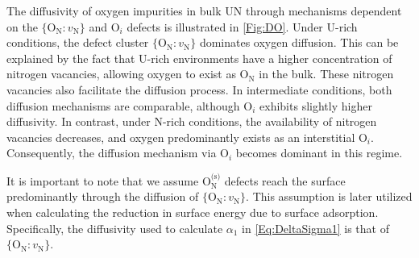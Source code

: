 \documentclass[preprint,12pt,sort&compress]{elsarticle}
\newcommand{\?}{\stackrel{?}{=}}
\providecommand{\DIFdeltex}[1]{} %
\providecommand{\DIFdelbegin}{\protect\color{red}} %
\providecommand{\DIFdelFL}[1]{\DIFdel{#1}} %
\providecommand{\DIFdel}[1]{\texorpdfstring{\DIFdeltex{#1}}{}} %
\newcommand{\DIFscaledelfig}{0.5}
\newlength{\DIFdelgraphicswidth} %
\newlength{\DIFdelgraphicsheight} %
\newcommand{\DIFdelincludegraphics}[2][]{%
\sbox{\DIFdelgraphicsbox}{\DIFOincludegraphics[#1]{#2}}%
\settoboxwidth{\DIFdelgraphicswidth}{\DIFdelgraphicsbox} %
\settoboxtotalheight{\DIFdelgraphicsheight}{\DIFdelgraphicsbox} %
\scalebox{\DIFscaledelfig}{%
\parbox[b]{\DIFdelgraphicswidth}{\usebox{\DIFdelgraphicsbox}\\[-\baselineskip] \rule{\DIFdelgraphicswidth}{0em}}\llap{\resizebox{\DIFdelgraphicswidth}{\DIFdelgraphicsheight}{%
\setlength{\unitlength}{\DIFdelgraphicswidth}%
\begin{picture}(1,1)%
\thicklines\linethickness{2pt} %
{\color[rgb]{1,0,0}\put(0,0){\framebox(1,1){}}}%
{\color[rgb]{1,0,0}\put(0,0){\line( 1,1){1}}}%
{\color[rgb]{1,0,0}\put(0,1){\line(1,-1){1}}}%
\end{picture}%
}\hspace*{3pt}}} %
} %
\DeclareRobustCommand{\DIFdelbegin}{\DIFOdelbegin \let\includegraphics\DIFdelincludegraphics} %
\begin{document}
The diffusivity of oxygen impurities in bulk UN through mechanisms dependent on the $\{\text{O}_\text{N} \! : \! v_\text{N}\}$ and $\text{O}_i$ defects is illustrated in \cref{Fig:DO}. Under U-rich conditions, the defect cluster $ \{\text{O}_\text{N} \! : \! v_\text{N}\} $ dominates oxygen diffusion. This can be explained by the fact that U-rich environments have a higher concentration of nitrogen vacancies, allowing oxygen to exist as $ \text{O}_\text{N} $ in the bulk. These nitrogen vacancies also facilitate the diffusion process. In intermediate conditions, both diffusion mechanisms are comparable, although $ \text{O}_i $ exhibits slightly higher diffusivity. In contrast, under N-rich conditions, the availability of nitrogen vacancies decreases, and oxygen predominantly exists as an interstitial $ \text{O}_i $. Consequently, the diffusion mechanism via $ \text{O}_i $ becomes dominant in this regime.

It is important to note that we assume $ \text{O}_\text{N}^\text{(s)} $ defects reach the surface predominantly through the diffusion of $ \{\text{O}_\text{N} \! : \! v_\text{N}\} $. This assumption is later utilized when calculating the reduction in surface energy due to surface adsorption. Specifically, the diffusivity used to calculate $\alpha_1$ in \cref{Eq:DeltaSigma1} is that of $ \{\text{O}_\text{N} \! : \! v_\text{N}\} $.

\DIFdelbegin %
{%
\DIFdelFL{(Color online) Diffusivity of oxygen impurities in bulk UN by the defects $ \{\text{O}_\text{N} \! : \! v_\text{N}\} $ and $ \text{O}_i $ under U-rich (blue), Intermediate (orange), and N-rich (green) conditions.}}
\end{document}
